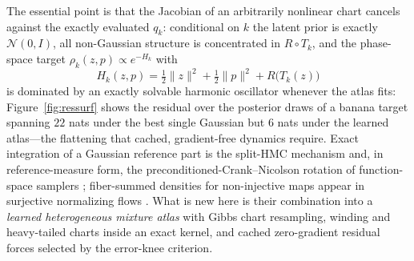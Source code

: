 \documentclass[11pt]{article}
\theoremstyle{remark}
\begin{document}
The essential point is that the Jacobian of an arbitrarily nonlinear chart
cancels against the exactly evaluated $q_k$: conditional on $k$ the latent
prior is exactly $\mathcal N(0,I)$, all non-Gaussian structure is
concentrated in $R\circ T_k$, and the phase-space target
$\rho_k(z,p)\propto e^{-H_k}$ with
\begin{equation}
H_k(z,p)=\tfrac12\lVert z\rVert^2+\tfrac12\lVert p\rVert^2
+R\bigl(T_k(z)\bigr)
\label{eq:H}
\end{equation}
is dominated by an exactly solvable harmonic oscillator whenever the atlas
fits: Figure~\ref{fig:ressurf} shows the residual over the posterior
draws of a banana target spanning $22$ nats under the best single
Gaussian but $6$ nats under the learned atlas---the flattening that
cached, gradient-free dynamics require. Exact integration of a Gaussian reference
part is the split-HMC mechanism \citep{shahbaba2013} and, in
reference-measure form, the preconditioned-Crank--Nicolson rotation of
function-space samplers \citep{beskos2011,cotter2013}; fiber-summed
densities for non-injective maps appear in surjective normalizing flows
\citep{nielsen2020}. What is new here is their combination into a
\emph{learned heterogeneous mixture atlas} with Gibbs chart resampling,
winding and heavy-tailed charts inside an exact kernel, and cached
zero-gradient residual forces selected by the error-knee criterion.
\end{document}
